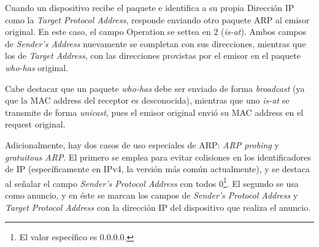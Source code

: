 \par Cuando un dispositivo recibe el paquete e identifica a su propia Dirección IP como la \textit{Target Protocol Address}, responde enviando otro paquete ARP al emisor original.
En este caso, el campo Operation se settea en 2 (\textit{is-at}).
Ambos campos de \textit{Sender's Address} nuevamente se completan con sus direcciones, mientras que los de \textit{Target Address}, con las direcciones provistas por el emisor en el paquete \textit{who-has} original.

\par Cabe destacar que un paquete \textit{who-has} debe ser enviado de forma \textit{broadcast} (ya que la MAC address del receptor es desconocida), mientras que uno \textit{is-at} se transmite de forma \textit{unicast}, pues el emisor original envió su MAC address en el request original.

\par Adicionalmente, hay dos casos de uso especiales de ARP: \textit{ARP probing} y \textit{gratuitous ARP}.
El primero se emplea para evitar colisiones en los identificadores de IP (específicamente en IPv4, la versión más común actualmente), y se destaca al señalar el campo \textit{Sender's Protocol Address} con todos 0\footnote{El valor específico es 0.0.0.0.}.
El segundo se usa como anuncio, y en éste se marcan los campos de \textit{Sender's Protocol Address} y \textit{Target Protocol Address} con la dirección IP del dispositivo que realiza el anuncio. 
